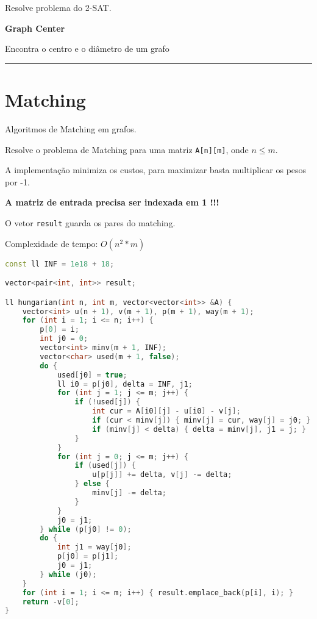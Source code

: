 \documentclass[11pt, a4paper, twoside]{book}
\begin{document}
Resolve problema do 2-SAT.





\textbf{Graph Center} 



Encontra o centro e o diâmetro de um grafo






\hfill

\rule{\textwidth}{0.4pt}

\section{Matching}



Algoritmos de Matching em grafos.



Resolve o problema de Matching para uma matriz \lstinline{A[n][m]}, onde $n \leq m$.



A implementação minimiza os custos, para maximizar basta multiplicar os pesos por -1.



\textbf{A matriz de entrada precisa ser indexada em 1 !!!}



O vetor \lstinline{result} guarda os pares do matching.



Complexidade de tempo: $O(n^2 * m)$


\hfill

\begin{lstlisting}[language=C++]
const ll INF = 1e18 + 18;

vector<pair<int, int>> result;

ll hungarian(int n, int m, vector<vector<int>> &A) {
    vector<int> u(n + 1), v(m + 1), p(m + 1), way(m + 1);
    for (int i = 1; i <= n; i++) {
        p[0] = i;
        int j0 = 0;
        vector<int> minv(m + 1, INF);
        vector<char> used(m + 1, false);
        do {
            used[j0] = true;
            ll i0 = p[j0], delta = INF, j1;
            for (int j = 1; j <= m; j++) {
                if (!used[j]) {
                    int cur = A[i0][j] - u[i0] - v[j];
                    if (cur < minv[j]) { minv[j] = cur, way[j] = j0; }
                    if (minv[j] < delta) { delta = minv[j], j1 = j; }
                }
            }
            for (int j = 0; j <= m; j++) {
                if (used[j]) {
                    u[p[j]] += delta, v[j] -= delta;
                } else {
                    minv[j] -= delta;
                }
            }
            j0 = j1;
        } while (p[j0] != 0);
        do {
            int j1 = way[j0];
            p[j0] = p[j1];
            j0 = j1;
        } while (j0);
    }
    for (int i = 1; i <= m; i++) { result.emplace_back(p[i], i); }
    return -v[0];
}
\end{lstlisting}
\end{document}
